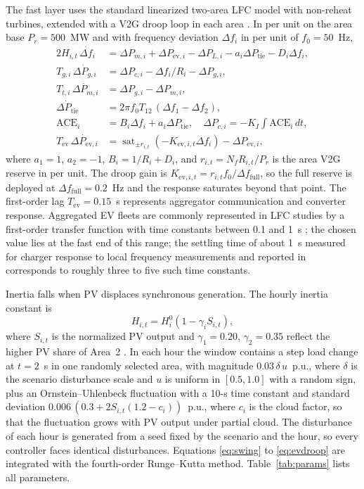 The fast layer uses the standard linearized two-area LFC model
\cite{Kundur1994,Bevrani2014} with non-reheat turbines, extended with a
V2G droop loop in each area \cite{Izadkhast2015}. In per unit on the
area base $P_r=500$~MW and with frequency deviation $\Delta f_i$ in per
unit of $f_0=50$~Hz,
\begin{align}
2H_{i,t}\,\dot{\Delta f_i}&=\Delta P_{m,i}+\Delta P_{\mathrm{ev},i}-\Delta P_{L,i}
-a_i\Delta P_{\mathrm{tie}}-D_i\Delta f_i,\label{eq:swing}\\
T_{g,i}\,\dot{\Delta P_{g,i}}&=\Delta P_{c,i}-\Delta f_i/R_i-\Delta P_{g,i},\\
T_{t,i}\,\dot{\Delta P_{m,i}}&=\Delta P_{g,i}-\Delta P_{m,i},\\
\dot{\Delta P_{\mathrm{tie}}}&=2\pi f_0T_{12}\,(\Delta f_1-\Delta f_2),\\
\mathrm{ACE}_i&=B_i\Delta f_i+a_i\Delta P_{\mathrm{tie}},\quad
\Delta P_{c,i}=-K_I\!\int\!\mathrm{ACE}_i\,dt,\label{eq:ace}\\
T_{\mathrm{ev}}\,\dot{\Delta P_{\mathrm{ev},i}}&=
\operatorname{sat}_{\pm r_{i,t}}\!\left(-K_{\mathrm{ev},i,t}\Delta f_i\right)-\Delta P_{\mathrm{ev},i},
\label{eq:evdroop}
\end{align}
where $a_1=1$, $a_2=-1$, $B_i=1/R_i+D_i$, and $r_{i,t}=N_fR_{i,t}/P_r$
is the area V2G reserve in per unit. The droop gain is
$K_{\mathrm{ev},i,t}=r_{i,t}f_0/\Delta f_{\mathrm{full}}$, so the full
reserve is deployed at $\Delta f_{\mathrm{full}}=0.2$~Hz and the
response saturates beyond that point. The first-order lag
$T_{\mathrm{ev}}=0.15$~s represents aggregator communication and
converter response. Aggregated EV fleets are commonly represented in
LFC studies by a first-order transfer function with time constants
between 0.1 and 1~s \cite{KoSung2018,Ziras2017}; the chosen value lies
at the fast end of this range; the settling time of about 1~s
measured for charger response to local frequency measurements and
reported in \cite{Ziras2017} corresponds to roughly three to five such
time constants.

Inertia falls when PV displaces synchronous generation. The hourly
inertia constant is
\begin{equation}
H_{i,t}=H_i^{0}\left(1-\gamma_i S_{i,t}\right),
\label{eq:inertia}
\end{equation}
where $S_{i,t}$ is the normalized PV output and $\gamma_1=0.20$,
$\gamma_2=0.35$ reflect the higher PV share of Area~2
\cite{Tielens2016}. In each hour the window contains a step load change
at $t=2$~s in one randomly selected area, with magnitude
$0.03\,\delta\,u$~p.u., where $\delta$ is the scenario disturbance scale
and $u$ is uniform in $[0.5,1.0]$ with a random sign, plus an
Ornstein--Uhlenbeck fluctuation with a 10-s time constant and standard
deviation $0.006\,(0.3+2S_{i,t}(1.2-c_i))$~p.u., where $c_i$ is the
cloud factor, so that the fluctuation grows with PV output under
partial cloud. The disturbance of
each hour is generated from a seed fixed by the scenario and the hour,
so every controller faces identical disturbances. Equations
\eqref{eq:swing} to \eqref{eq:evdroop} are integrated with the
fourth-order Runge--Kutta method. Table~\ref{tab:params} lists all
parameters.

